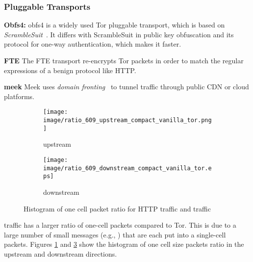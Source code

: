 \subsubsection{Pluggable Transports}
\begin{compactitem}
\item	\textbf{Obfs4:}
obfs4 is a widely used Tor pluggable transport, which is based on \textit{ScrambleSuit}~\cite{scramblesuit}. It differs with ScrambleSuit in public key obfuscation and its protocol for one-way authentication, which makes it faster. 
\item \textbf{FTE} 
The FTE transport re-encrypts Tor packets in order to match the regular expressions of a benign protocol like HTTP. 
\item\textbf{meek}
Meek uses \textit{domain fronting}~\cite{meek-PETS} to tunnel traffic through public CDN or cloud platforms. 
\end{compactitem}
\begin{figure}
\centering
\begin{subfigure}{0.48\linewidth}
\centering
\texttt{[image: image/ratio\_609\_upstream\_compact\_vanilla\_tor.png]}
\caption{upstream}
\label{fig:ratio_609_upstream_compact_vanilla_tor}
\end{subfigure}
\begin{subfigure}{0.48\linewidth}
\centering
\texttt{[image: image/ratio\_609\_downstream\_compact\_vanilla\_tor.eps]}
\caption{downstream}
\label{fig:ratio_609_downstream_compact_vanilla_tor}
\end{subfigure}
\caption{Histogram of one cell packet ratio for HTTP traffic and \bc traffic}
\end{figure}
\bc traffic has a larger ratio of one-cell packets compared to Tor. This is due to a large number of small \bc messages (e.g., ) that are each put into a single-cell packets. Figures \ref{fig:ratio_609_upstream_compact_vanilla_tor} and \ref{fig:ratio_609_downstream_compact_vanilla_tor} show the histogram of one cell size packets ratio in the upstream and downstream directions.


\iffalse, we show that this does not remove all traffic patterns that reveal \bc. We compare the distribution of packet sizes in HTTP traffic and \bc traffic behind Tor. 
Figures~\ref{fig:tor_reg_traffic_pkt_size_upstream} to \ref{fig:tor_compact_block_pkt_size_downstream} in Appendix~\ref{sec:bcshape} compare the distribution of packet sizes of HTTP and \bc when tunneled over Tor in different modes, showing an identifiable pattern.\fi
 
